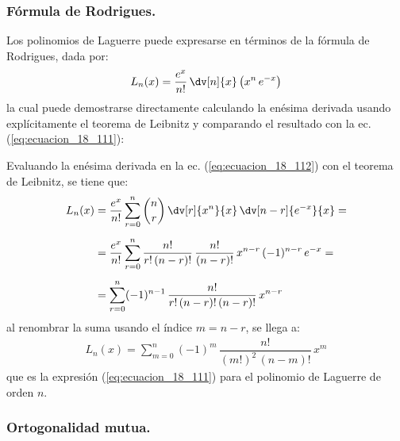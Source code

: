 \subsubsection{Fórmula de Rodrigues.}
Los polinomios de Laguerre puede expresarse en términos de la fórmula de Rodrigues, dada por:
\begin{align}
L_{n} (x) = \dfrac{e^{x}}{n!} \, \dv[n]{x} \left( x^{n} \, e^{-x} \right)
\label{eq:ecuacion_18_112}
\end{align}
la cual puede demostrarse directamente calculando la enésima derivada usando explícitamente el teorema de Leibnitz y comparando el resultado con la ec. (\ref{eq:ecuacion_18_111}):
\par
Evaluando la enésima derivada en la ec. (\ref{eq:ecuacion_18_112}) con el teorema de Leibnitz, se tiene que:
\begin{align*}
L_{n}(x) &= \dfrac{e^{x}}{n!} \sum_{r=0}^{n} \binom{n}{r} \, \dv[r]{x^{n}}{x} \, \dv[n-r]{e^{-x}}{x} = \\[0.5em]
&= \dfrac{e^{x}}{n!} \sum_{r=0}^{n}  \dfrac{n!}{r! \, (n - r)!} \, \dfrac{n!}{(n - r)!} \, x^{n-r} \, (-1)^{n-r} \, e^{-x} = \\[0.5em]
&= \sum_{r=0}^{n} (-1)^{n-1} \, \dfrac{n!}{r! \, (n - r)! \, (n - r)!} \, x^{n-r}
\end{align*}
al renombrar la suma usando el índice $m = n - r$, se llega a:
\begin{align*}
L_{n}(x) = \sum_{m=0}^{n} (-1)^{m} \, \dfrac{n!}{(m!)^{2} \, (n - m)!} \, x^{m}
\end{align*}
que es la expresión (\ref{eq:ecuacion_18_111}) para el polinomio de Laguerre de orden $n$.

\subsubsection{Ortogonalidad mutua.}

